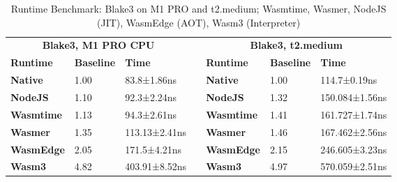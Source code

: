 \begin{table}[]
    \begin{tabular}{|lll|l|lll|}
    \cline{1-3} \cline{5-7}
    \multicolumn{3}{|c|}{\textbf{Blake3, M1 PRO CPU}}                                                & \multirow{8}{*}{} & \multicolumn{3}{c|}{\textbf{Blake3, t2.medium}}                                                  \\ \cline{1-3} \cline{5-7} 
    \multicolumn{1}{|l|}{\textbf{Runtime}}  & \multicolumn{1}{l|}{\textbf{Baseline}} & \textbf{Time} &                   & \multicolumn{1}{l|}{\textbf{Runtime}}  & \multicolumn{1}{l|}{\textbf{Baseline}} & \textbf{Time}  \\ \cline{1-3} \cline{5-7} 
    \multicolumn{1}{|l|}{\textbf{Native}}   & \multicolumn{1}{l|}{1.00}              & 83.8±1.86ns   &                   & \multicolumn{1}{l|}{\textbf{Native}}   & \multicolumn{1}{l|}{1.00}              & 114.7±0.19ns   \\ \cline{1-3} \cline{5-7} 
    \multicolumn{1}{|l|}{\textbf{NodeJS}}   & \multicolumn{1}{l|}{1.10}              & 92.3±2.24ns   &                   & \multicolumn{1}{l|}{\textbf{NodeJS}}   & \multicolumn{1}{l|}{1.32}              & 150.084±1.56ns \\ \cline{1-3} \cline{5-7} 
    \multicolumn{1}{|l|}{\textbf{Wasmtime}} & \multicolumn{1}{l|}{1.13}              & 94.3±2.61ns   &                   & \multicolumn{1}{l|}{\textbf{Wasmtime}} & \multicolumn{1}{l|}{1.41}              & 161.727±1.74ns \\ \cline{1-3} \cline{5-7} 
    \multicolumn{1}{|l|}{\textbf{Wasmer}}   & \multicolumn{1}{l|}{1.35}              & 113.13±2.41ns &                   & \multicolumn{1}{l|}{\textbf{Wasmer}}   & \multicolumn{1}{l|}{1.46}              & 167.462±2.56ns \\ \cline{1-3} \cline{5-7} 
    \multicolumn{1}{|l|}{\textbf{WasmEdge}} & \multicolumn{1}{l|}{2.05}              & 171.5±4.21ns  &                   & \multicolumn{1}{l|}{\textbf{WasmEdge}} & \multicolumn{1}{l|}{2.15}              & 246.605±3.23ns \\ \cline{1-3} \cline{5-7} 
    \multicolumn{1}{|l|}{\textbf{Wasm3}}    & \multicolumn{1}{l|}{4.82}              & 403.91±8.52ns &                   & \multicolumn{1}{l|}{\textbf{Wasm3}}    & \multicolumn{1}{l|}{4.97}              & 570.059±2.51ns \\ \cline{1-3} \cline{5-7} 
    \end{tabular}
    \caption{Runtime Benchmark: Blake3 on M1 PRO and t2.medium; Wasmtime, Wasmer, NodeJS (JIT), WasmEdge (AOT), Wasm3 (Interpreter)}
    \label{tab:blake3}
\end{table}

